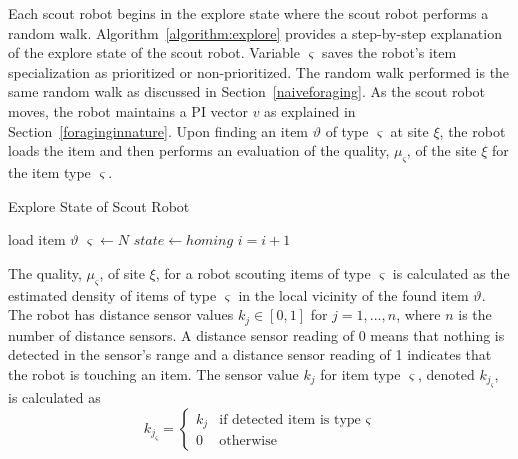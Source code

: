 \documentclass[preprint,12pt]{elsarticle}
\begin{document}
Each scout robot begins in the explore state where the scout robot performs a random walk. Algorithm~\ref{algorithm:explore} provides a step-by-step explanation of the explore state of the scout robot. Variable $\varsigma$ saves the robot's item specialization as prioritized or non-prioritized. The random walk performed is the same random walk as discussed in Section~\ref{naiveforaging}. As the scout robot moves, the robot maintains a PI vector $v$ as explained in Section~\ref{foraginginnature}. Upon finding an item $\vartheta$ of type $\varsigma$ at site $\xi$, the robot loads the item and then performs an evaluation of the quality, $\mu_\varsigma$, of the site $\xi$ for the item type $\varsigma$. 


\begin{algorithm}
\caption{Explore State of Scout Robot}
\label{algorithm:explore}
\begin{algorithmic}[1]
\State {}
\State {}

 	\State {}
	\State load item $\vartheta$
	\State $\varsigma \gets N$
	\State $state \gets homing$
\EndIf
\State $i = i + 1$
\EndFunction
\end{algorithmic}
\end{algorithm}

The quality, $\mu_\varsigma$, of site $\xi$, for a robot scouting items of type $\varsigma$ is calculated as the estimated density of items of type $\varsigma$ in the local vicinity of the found item $\vartheta$. The robot has distance sensor values $k_j\in[0,1]$ for $j = 1,...,n$, where $n$ is the number of distance sensors. A distance sensor reading of 0 means that nothing is detected in the sensor's range and a distance sensor reading of 1 indicates that the robot is touching an item. The sensor value $k_j$ for item type $\varsigma$, denoted $k_{j_\varsigma}$, is calculated as 
\begin{equation}
\label{densitytype}
k_{j_\varsigma}=
    \begin{cases}
      k_j & \text{if detected item is type $\varsigma$} \\
      0 & \text{otherwise}
    \end{cases}
\end{equation}
\end{document}
